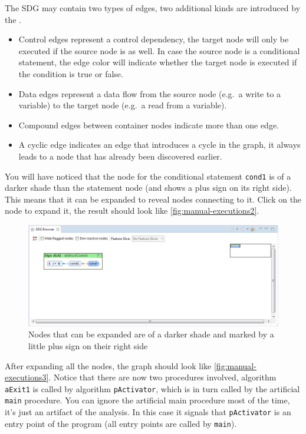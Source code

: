 The SDG may contain two types of edges, two additional kinds are introduced by the \SB.

\begin{itemize}
  \item Control edges represent a control dependency, the target node will only be executed if the source node is as 
  well. In case the source node is a conditional statement, the edge color will indicate whether the target node is 
  executed if the condition is true or false.
  
  \item Data edges represent a data flow from the source node (e.g.\ a write to a variable) to the target node (e.g.\ a 
  read from a variable).
  
  \item Compound edges between container nodes indicate more than one edge.
  
  \item A cyclic edge indicates an edge that introduces a cycle in the graph, it always leads to a node that has 
  already been discovered earlier.
\end{itemize}

You will have noticed that the node for the conditional statement \lstinline|cond1| is of a darker shade than the 
statement node (and shows a plus sign on its right side). This means that it can be expanded to reveal nodes connecting 
to it. Click on the node to expand it, the result should look like \autoref{fig:manual-executions2}.

\begin{figure}[hp]
  \centering
    \includegraphics[width=\textwidth]{bilder/manual-executions2}
  \caption{Nodes that can be expanded are of a darker shade and marked by a little plus sign on their right side}
  \label{fig:manual-executions2}
\end{figure}

After expanding all the nodes, the graph should look like \autoref{fig:manual-executions3}. Notice that there are now 
two procedures involved, algorithm \lstinline|aExit1| is called by algorithm \lstinline|pActivator|, which is in turn 
called by the artificial \lstinline|main| procedure. You can ignore the artificial main procedure most of the time, 
it's just an artifact of the analysis. In this case it signals that \lstinline|pActivator| is an entry point of the 
program (all entry points are called by \lstinline|main|).

